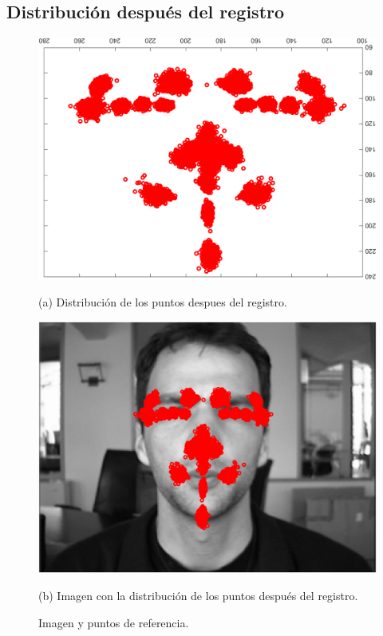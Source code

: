 \documentclass[11pt, letterpaper]{article}
\begin{document}
\newpage

\subsection{Distribución después del registro}

\begin{figure}[h!]
	\centering
	\begin{minipage}{0.4\textwidth}
		\centering
		\includegraphics[width=\textwidth]{IMG/R5.png}
		\caption*{(a) Distribución de los puntos despues del registro.}
	\end{minipage}\hfill
	\begin{minipage}{0.4\textwidth}
		\centering
		\includegraphics[width=\textwidth]{IMG/R6.png}
		\caption*{(b) Imagen con la distribución de los puntos después del registro.}
	\end{minipage}
	\caption{Imagen y puntos de referencia.}
	\label{fig:f3}
\end{figure}
\end{document}
